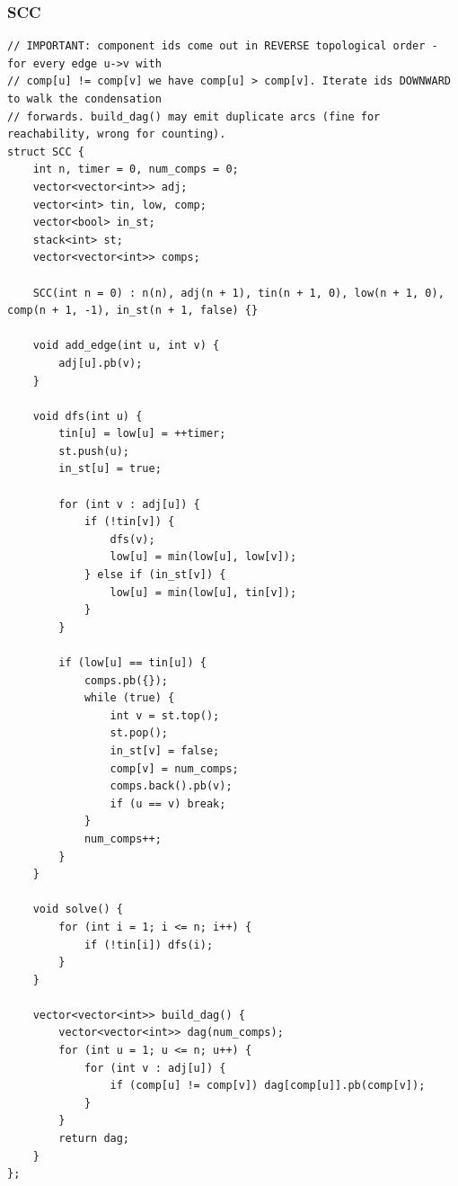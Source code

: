\documentclass[9pt,a4paper,twocolumn]{extarticle}
\begin{document}
\filbreak
\subsubsection{SCC}
\nopagebreak
\begin{lstlisting}
// IMPORTANT: component ids come out in REVERSE topological order - for every edge u->v with
// comp[u] != comp[v] we have comp[u] > comp[v]. Iterate ids DOWNWARD to walk the condensation
// forwards. build_dag() may emit duplicate arcs (fine for reachability, wrong for counting).
struct SCC {
    int n, timer = 0, num_comps = 0;
    vector<vector<int>> adj;
    vector<int> tin, low, comp;
    vector<bool> in_st;
    stack<int> st;
    vector<vector<int>> comps;

    SCC(int n = 0) : n(n), adj(n + 1), tin(n + 1, 0), low(n + 1, 0), comp(n + 1, -1), in_st(n + 1, false) {}

    void add_edge(int u, int v) {
        adj[u].pb(v);
    }

    void dfs(int u) {
        tin[u] = low[u] = ++timer;
        st.push(u);
        in_st[u] = true;

        for (int v : adj[u]) {
            if (!tin[v]) {
                dfs(v);
                low[u] = min(low[u], low[v]);
            } else if (in_st[v]) {
                low[u] = min(low[u], tin[v]);
            }
        }

        if (low[u] == tin[u]) {
            comps.pb({});
            while (true) {
                int v = st.top();
                st.pop();
                in_st[v] = false;
                comp[v] = num_comps;
                comps.back().pb(v);
                if (u == v) break;
            }
            num_comps++;
        }
    }

    void solve() {
        for (int i = 1; i <= n; i++) {
            if (!tin[i]) dfs(i);
        }
    }

    vector<vector<int>> build_dag() {
        vector<vector<int>> dag(num_comps);
        for (int u = 1; u <= n; u++) {
            for (int v : adj[u]) {
                if (comp[u] != comp[v]) dag[comp[u]].pb(comp[v]);
            }
        }
        return dag;
    }
};
\end{lstlisting}

\filbreak
\end{document}

